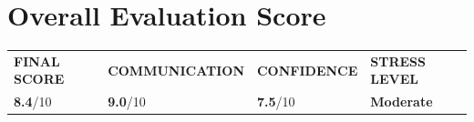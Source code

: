 \documentclass[11pt,a4paper]{article}
\begin{document}
\section{Overall Evaluation Score}
\begin{tcolorbox}[
  colback=WiseLight, colframe=WiseLight, 
  arc=6pt, boxrule=0pt,
  top=16pt, bottom=16pt, left=0pt, right=0pt
]
  \centering
  \renewcommand{\arraystretch}{1}
  \begin{tabularx}{\linewidth}{
    >{\centering\arraybackslash}X |
    >{\centering\arraybackslash}X |
    >{\centering\arraybackslash}X |
    >{\centering\arraybackslash}X
  }
    \textcolor{WiseGray}{\fontsize{9}{11}\selectfont\bfseries FINAL SCORE} & 
    \textcolor{WiseGray}{\fontsize{9}{11}\selectfont\bfseries COMMUNICATION} & 
    \textcolor{WiseGray}{\fontsize{9}{11}\selectfont\bfseries CONFIDENCE} & 
    \textcolor{WiseGray}{\fontsize{9}{11}\selectfont\bfseries STRESS LEVEL} \\[12pt]
    
    \textcolor{WiseNavy}{\huge\bfseries 8.4}\textcolor{WiseGray}{\large /10} & 
    \textcolor{GreenDark}{\huge\bfseries 9.0}\textcolor{WiseGray}{\large /10} & 
    \textcolor{WiseThemeBg}{\huge\bfseries 7.5}\textcolor{WiseGray}{\large /10} & 
    \textcolor{OrangeDark}{\huge\bfseries Moderate} \\
  \end{tabularx}
\end{tcolorbox}

\end{document}
